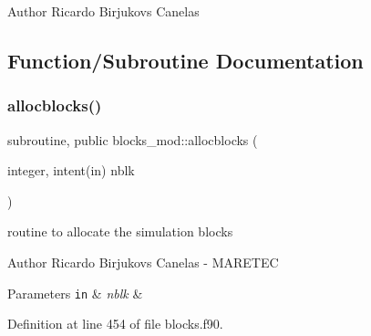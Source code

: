 \begin{DoxyAuthor}{Author}
Ricardo Birjukovs Canelas 
\end{DoxyAuthor}


\subsection{Function/\+Subroutine Documentation}
\mbox{\label{namespaceblocks__mod_a639beb0fee2290d46353f4b4702d6711}} 
\subsubsection{\texorpdfstring{allocblocks()}{allocblocks()}}
{\footnotesize\ttfamily subroutine, public blocks\+\_\+mod\+::allocblocks (\begin{DoxyParamCaption}\item[{integer, intent(in)}]{nblk }\end{DoxyParamCaption})}



routine to allocate the simulation blocks 

\begin{DoxyAuthor}{Author}
Ricardo Birjukovs Canelas -\/ M\+A\+R\+E\+T\+EC 
\end{DoxyAuthor}

\begin{DoxyParams}[1]{Parameters}
\mbox{\tt in}  & {\em nblk} & \\
\hline
\end{DoxyParams}


Definition at line 454 of file blocks.\+f90.


